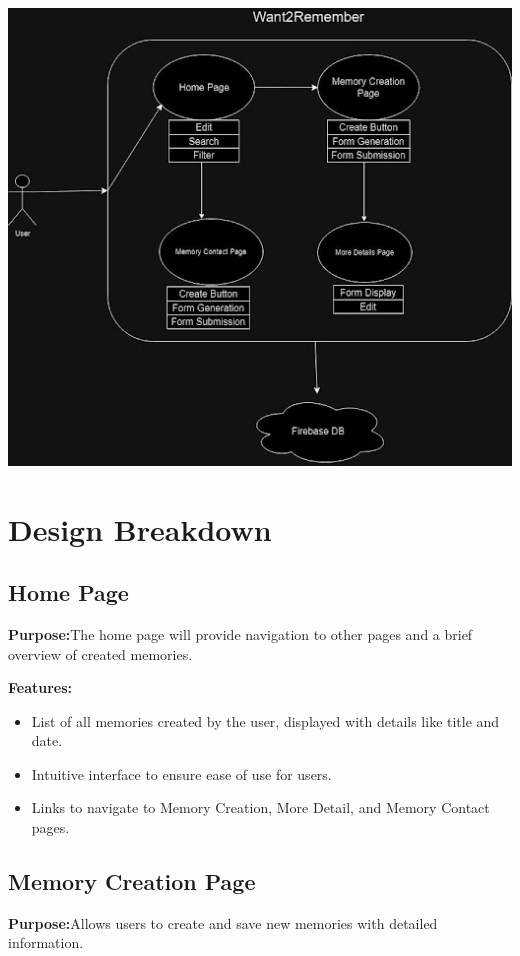 \documentclass[12pt]{article}
\begin{document}
\includegraphics{snapshot4img4.jpg}


\section{Design Breakdown}

\subsection{Home Page}
\textbf{Purpose:}The home page will provide navigation to other pages and a brief overview of created memories.

\textbf{Features:}
\begin{itemize}
    \item List of all memories created by the user, displayed with details like title and date.
    \item Intuitive interface to ensure ease of use for users.
    \item Links to navigate to Memory Creation, More Detail, and Memory Contact pages.
\end{itemize}

\subsection{Memory Creation Page}
\textbf{Purpose:}Allows users to create and save new memories with detailed information.
\end{document}
